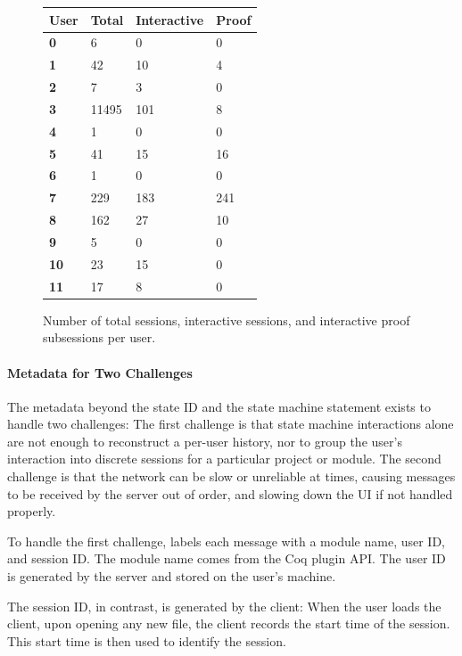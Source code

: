 \begin{figure}
\begin{minipage}{0.31\textwidth}
\centering
\begin{tabular}{ |l|l|l|l| }
 \hline
  \textbf{User} & \textbf{Total} & \textbf{Interactive} & \textbf{Proof}\\
\hline
  \textbf{0} & 6 &  0 & 0 \\
  \textbf{1} & 42 & 10 & 4 \\
  \textbf{2} & 7 & 3 & 0 \\
  \textbf{3} & 11495 & 101 & 8 \\
  \textbf{4} & 1 & 0 & 0 \\
  \textbf{5} & 41 & 15 & 16 \\
  \textbf{6} & 1 & 0 & 0 \\
  \textbf{7} & 229 & 183 & 241 \\
  \textbf{8} & 162 & 27 & 10 \\
  \textbf{9} & 5 & 0 & 0 \\
  \textbf{10} & 23 & 15 & 0 \\
  \textbf{11} & 17 & 8 & 0 \\
\hline
\end{tabular}
\caption{Number of total sessions, interactive sessions,
  and interactive proof subsessions per user.}
\label{tab:sessions}
\end{minipage}
\end{figure}

\paragraph{Metadata for Two Challenges}
The metadata beyond the state ID and the state machine
statement exists to handle two challenges:
The first challenge is that state machine interactions alone
are not enough to reconstruct a per-user history,
nor to group the user's interaction into discrete sessions
for a particular project or module.
The second challenge is that the network can be slow or unreliable at times,
causing messages to be received by the server out of order,
and slowing down the UI if not handled properly.

To handle the first challenge, \toolname labels each message with
a module name, user ID, and session ID.
The module name comes from the Coq plugin API.
The user ID is generated by the server and stored on the user's machine.

The session ID, in contrast, is generated by the client:
When the user loads the client, upon opening any new file,
the client records the start time of the session.
This start time is then used to identify the session.

